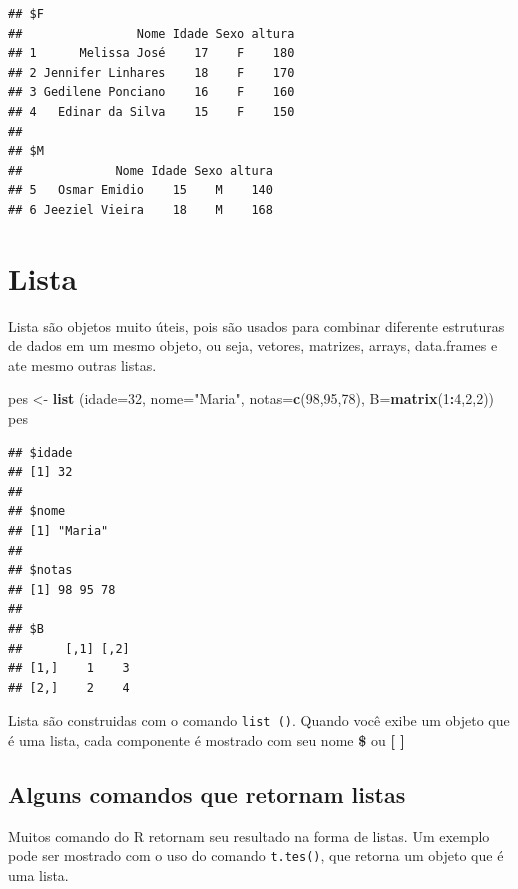 \documentclass[
]{book}
\newenvironment{Shaded}{\begin{snugshade}}{\end{snugshade}}
\newcommand{\DataTypeTok}[1]{\textcolor[rgb]{0.13,0.29,0.53}{#1}}
\newcommand{\DecValTok}[1]{\textcolor[rgb]{0.00,0.00,0.81}{#1}}
\newcommand{\KeywordTok}[1]{\textcolor[rgb]{0.13,0.29,0.53}{\textbf{#1}}}
\newcommand{\NormalTok}[1]{#1}
\newcommand{\OperatorTok}[1]{\textcolor[rgb]{0.81,0.36,0.00}{\textbf{#1}}}
\newcommand{\StringTok}[1]{\textcolor[rgb]{0.31,0.60,0.02}{#1}}
\begin{document}
\begin{verbatim}
## $F
##                Nome Idade Sexo altura
## 1      Melissa José    17    F    180
## 2 Jennifer Linhares    18    F    170
## 3 Gedilene Ponciano    16    F    160
## 4   Edinar da Silva    15    F    150
## 
## $M
##             Nome Idade Sexo altura
## 5   Osmar Emidio    15    M    140
## 6 Jeeziel Vieira    18    M    168
\end{verbatim}

\hypertarget{lista}{%
\section{Lista}\label{lista}}

Lista são objetos muito úteis, pois são usados para combinar diferente estruturas de dados em um mesmo objeto, ou seja, vetores, matrizes, arrays, data.frames e ate mesmo outras listas.

\begin{Shaded}
\begin{Highlighting}[]
\NormalTok{pes <-}\StringTok{ }\KeywordTok{list}\NormalTok{ (}\DataTypeTok{idade=}\DecValTok{32}\NormalTok{, }\DataTypeTok{nome=}\StringTok{"Maria"}\NormalTok{, }\DataTypeTok{notas=}\KeywordTok{c}\NormalTok{(}\DecValTok{98}\NormalTok{,}\DecValTok{95}\NormalTok{,}\DecValTok{78}\NormalTok{), }\DataTypeTok{B=}\KeywordTok{matrix}\NormalTok{(}\DecValTok{1}\OperatorTok{:}\DecValTok{4}\NormalTok{,}\DecValTok{2}\NormalTok{,}\DecValTok{2}\NormalTok{))}
\NormalTok{pes}
\end{Highlighting}
\end{Shaded}

\begin{verbatim}
## $idade
## [1] 32
## 
## $nome
## [1] "Maria"
## 
## $notas
## [1] 98 95 78
## 
## $B
##      [,1] [,2]
## [1,]    1    3
## [2,]    2    4
\end{verbatim}

Lista são construidas com o comando \texttt{list\ ()}. Quando você exibe um objeto que é uma lista, cada componente é mostrado com seu nome \textbf{\$} ou \textbf{{[} {]}}

\hypertarget{alguns-comandos-que-retornam-listas}{%
\subsection{Alguns comandos que retornam listas}\label{alguns-comandos-que-retornam-listas}}

Muitos comando do R retornam seu resultado na forma de listas. Um exemplo pode ser mostrado com o uso do comando \texttt{t.tes()}, que retorna um objeto que é uma lista.
\end{document}
